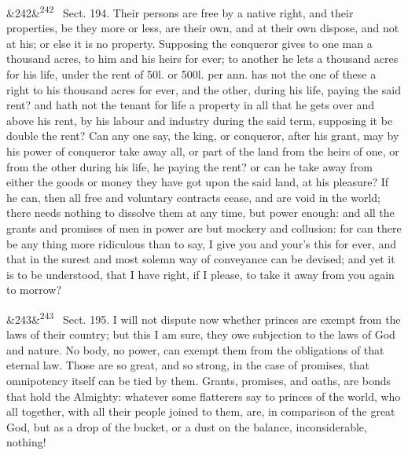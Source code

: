 \documentclass[12pt]{article}
\newcommand{\para}[1][]{\par\noindent\ifx&#1&\else\textsuperscript{\footnotesize #1}~\fi}
\begin{document}
\para[242] Sect. 194. Their persons are free by a native right, and their properties, be they more or less, are their own, and at their own dispose, and not at his; or else it is no property. Supposing the conqueror gives to one man a thousand acres, to him and his heirs for ever; to another he lets a thousand acres for his life, under the rent of 50l. or 500l. per ann. has not the one of these a right to his thousand acres for ever, and the other, during his life, paying the said rent? and hath not the tenant for life a property in all that he gets over and above his rent, by his labour and industry during the said term, supposing it be double the rent? Can any one say, the king, or conqueror, after his grant, may by his power of conqueror take away all, or part of the land from the heirs of one, or from the other during his life, he paying the rent? or can he take away from either the goods or money they have got upon the said land, at his pleasure? If he can, then all free and voluntary contracts cease, and are void in the world; there needs nothing to dissolve them at any time, but power enough: and all the grants and promises of men in power are but mockery and collusion: for can there be any thing more ridiculous than to say, I give you and your's this for ever, and that in the surest and most solemn way of conveyance can be devised; and yet it is to be understood, that I have right, if I please, to take it away from you again to morrow?

\para[243] Sect. 195. I will not dispute now whether princes are exempt from the laws of their country; but this I am sure, they owe subjection to the laws of God and nature. No body, no power, can exempt them from the obligations of that eternal law. Those are so great, and so strong, in the case of promises, that omnipotency itself can be tied by them. Grants, promises, and oaths, are bonds that hold the Almighty: whatever some flatterers say to princes of the world, who all together, with all their people joined to them, are, in comparison of the great God, but as a drop of the bucket, or a dust on the balance, inconsiderable, nothing!
\end{document}
